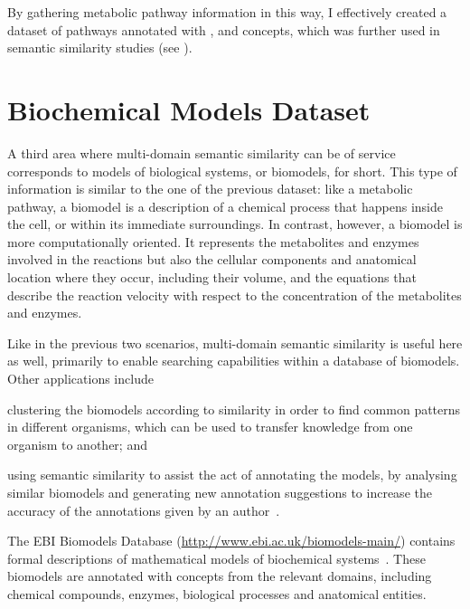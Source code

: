 By gathering metabolic pathway information in this way, I effectively created a dataset of pathways annotated with ,  and  concepts, which was further used in semantic similarity studies (see ).


\section{Biochemical Models Dataset} \label{sec:data/biomodels}

A third area where multi-domain semantic similarity can be of service corresponds to models of biological systems, or biomodels, for short. This type of information is similar to the one of the previous dataset: like a metabolic pathway, a biomodel is a description of a chemical process that happens inside the cell, or within its immediate surroundings. In contrast, however, a biomodel is more computationally oriented. It represents the metabolites and enzymes involved in the reactions but also the cellular components and anatomical location where they occur, including their volume, and the equations that describe the reaction velocity with respect to the concentration of the metabolites and enzymes.

Like in the previous two scenarios, multi-domain semantic similarity is useful here as well, primarily to enable searching capabilities within a database of biomodels. Other applications include
\begin{paralist}
    \item clustering the biomodels according to similarity in order to find common patterns in different organisms, which can be used to transfer knowledge from one organism to another; and
    \item using semantic similarity to assist the act of annotating the models, by analysing similar biomodels and generating new annotation suggestions to increase the accuracy of the annotations given by an author~\citep{Schulz2012}.
\end{paralist}

The EBI Biomodels Database (\url{http://www.ebi.ac.uk/biomodels-main/}) contains formal descriptions of mathematical models of biochemical systems~\citep{Li2010a,Juty2015}. These biomodels are annotated with concepts from the relevant domains, including chemical compounds, enzymes, biological processes and anatomical entities.

